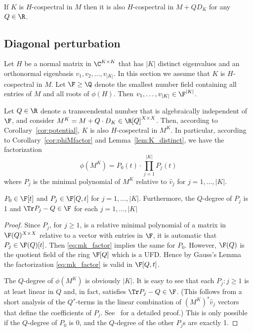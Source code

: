 \begin{coro}\label{cor:potential}
If $K$ is $H$-cospectral in $M$ then it is also $H$-cospectral in $M + Q D_K$ for any $Q \in \R$.
\end{coro}

\subsection{Diagonal perturbation}

Let $H$ be a normal matrix in $\C^{K \times K}$ that has $|K|$ distinct eigenvalues and an orthonormal eigenbasis $v_1, v_2, \dots, v_{|K|}$. In this section we assume that $K$ is $H$-cospectral in $M$. Let $\F \geq \Q$ denote the smallest number field containing all entries of  $M$ and all roots of $\phi(H)$. Then $v_1,\dots, v_{|K|} \in \F^{|K|}$. 

Let $Q \in \R$ denote a transcendental number that is algebraically independent of $\F$, and consider $M^K = M + Q \cdot D_K \in \R[Q]^{X \times X}$. Then, according to Corollary~\ref{cor:potential}, $K$ is also $H$-cospectral in $M^K$. In particular, according to Corollary~\ref{cor:phiMfactor} and Lemma~\ref{lem:K_distinct}, we have the factorization
\begin{equation}\label{eq:mk_factor} \phi(M^K) = P_0(t) \cdot \prod_{j=1}^{|K|} P_j(t) \end{equation} where $P_j$ is the minimal polynomial of $M^K$ relative to $\hat{v}_j$ for $j=1,\dots, |K|$. 

\begin{prop}\label{clm:deg_tr}
$P_0 \in \F[t]$ and $P_j \in \F[Q,t]$ for $j = 1,\dots,|K|$. Furthermore, the $Q$-degree of $P_j$ is 1  and $\Tr P_j - Q \in \F$ for each $j=1,\dots,|K|$
\end{prop}

\begin{proof}
Since $P_j$, for $j \geq 1$, is a relative minimal polynomial of a matrix in $\F(Q)^{X \times X}$ relative to a vector with entries in $\F$, it is automatic that $P_j \in \F(Q)[t]$. Then \eqref{eq:mk_factor} implies the same for $P_0$. However, $\F(Q)$ is the quotient field of the ring $\F[Q]$ which is a UFD. Hence by Gauss's Lemma the factorization \eqref{eq:mk_factor} is valid in $\F[Q,t]$.

The $Q$-degree of $\phi(M^K)$ is obviously $|K|$. It is easy to see that each $P_j : j \geq 1$ is at least linear in $Q$ and, in fact, satisfies $\Tr P_j - Q \in \F$. (This follows from a short analysis of the $Q^s$-terms in the linear combination of $(M^K)^s \hat{v}_j$ vectors that define the coefficients of $P_j$. See~\cite[Lemma 3.3]{eisenberg2019pretty} for a detailed proof.) This is only possible if the $Q$-degree of $P_0$ is 0, and the $Q$-degree of the other $P_j$s are exactly 1.
\end{proof}

